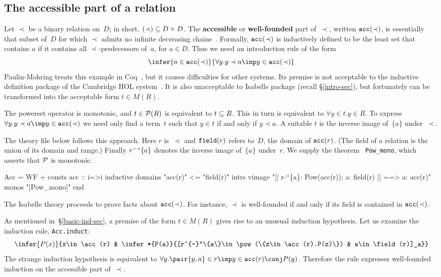 \subsection{The accessible part of a relation}\label{acc-sec}
Let $\prec$ be a binary relation on~$D$; in short, $(\prec)\subseteq D\times D$.
The {\bf accessible} or {\bf well-founded} part of~$\prec$, written
$\hbox{\tt acc}(\prec)$, is essentially that subset of~$D$ for which $\prec$ admits
no infinite decreasing chains~\cite{aczel77}.  Formally, $\hbox{\tt acc}(\prec)$ is
inductively defined to be the least set that contains $a$ if it contains
all $\prec$-predecessors of~$a$, for $a\in D$.  Thus we need an
introduction rule of the form 
\[ \infer{a\in\acc(\prec)}{\forall y.y\prec a\imp y\in\acc(\prec)} \]
Paulin-Mohring treats this example in Coq~\cite{paulin92}, but it causes
difficulties for other systems.  Its premise is not acceptable to the
inductive definition package of the Cambridge HOL
system~\cite{camilleri92}.  It is also unacceptable to Isabelle package
(recall \S\ref{intro-sec}), but fortunately can be transformed into the
acceptable form $t\in M(R)$.

The powerset operator is monotonic, and $t\in{\cal P}(R)$ is equivalent to
$t\subseteq R$.  This in turn is equivalent to $\forall y\in t. y\in R$.  To
express $\forall y.y\prec a\imp y\in\acc(\prec)$ we need only find a
term~$t$ such that $y\in t$ if and only if $y\prec a$.  A suitable $t$ is
the inverse image of~$\{a\}$ under~$\prec$.

The theory file below follows this approach.  Here $r$ is~$\prec$ and
$\hbox{\tt field}(r)$ refers to~$D$, the domain of $\hbox{\tt acc}(r)$.  (The field of a
relation is the union of its domain and range.)  Finally $r^{-}``\{a\}$
denotes the inverse image of~$\{a\}$ under~$r$.  We supply the theorem {\tt
  Pow\_mono}, which asserts that ${\cal P}$ is monotonic.
\begin{ttbox}
Acc = WF + 
consts    acc :: i=>i
inductive
  domains "acc(r)" <= "field(r)"
  intrs
    vimage  "[| r-``\{a\}: Pow(acc(r)); a: field(r) |] ==> a: acc(r)"
  monos     "[Pow_mono]"
end
\end{ttbox}
The Isabelle theory proceeds to prove facts about $\hbox{\tt acc}(\prec)$.  For
instance, $\prec$ is well-founded if and only if its field is contained in
$\hbox{\tt acc}(\prec)$.  

As mentioned in~\S\ref{basic-ind-sec}, a premise of the form $t\in M(R)$
gives rise to an unusual induction hypothesis.  Let us examine the
induction rule, {\tt Acc.induct}:
\[ \infer{P(x)}{x\in\acc(r) &
     \infer*{P(a)}{[r^{-}``\{a\}\in\pow(\{z\in\acc(r).P(z)\}) & 
                   a\in\field(r)]_a}}
\]
The strange induction hypothesis is equivalent to
$\forall y. \pair{y,a}\in r\imp y\in\acc(r)\conj P(y)$.
Therefore the rule expresses well-founded induction on the accessible part
of~$\prec$.

